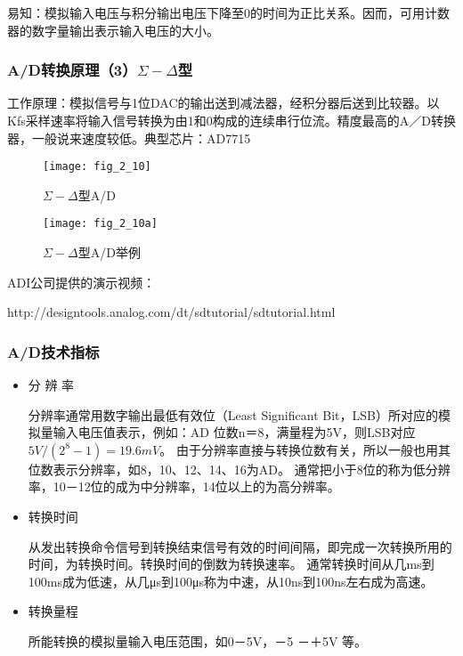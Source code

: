   易知：模拟输入电压与积分输出电压下降至0的时间为正比关系。因而，可用计数器的数字量输出表示输入电压的大小。







\subsubsection{A/D转换原理（3）$\Sigma-\Delta$型}

工作原理：模拟信号与1位DAC的输出送到减法器，经积分器后送到比较器。以Kfs采样速率将输入信号转换为由1和0构成的连续串行位流。精度最高的A／D转换器，一般说来速度较低。典型芯片：AD7715

\begin{figure}[h]
  \centering
  \texttt{[image: fig\_2\_10]}\\
  \caption{$\Sigma-\Delta$型A/D}\label{fig_2_10}
\end{figure}


\begin{figure}[h]
  \centering
  \texttt{[image: fig\_2\_10a]}\\
  \caption{$\Sigma-\Delta$型A/D举例}\label{fig_2_10a}
\end{figure}

\begin{remark}ADI公司提供的演示视频：

  http://designtools.analog.com/dt/sdtutorial/sdtutorial.html
\end{remark}


\subsubsection{A/D技术指标}



\begin{itemize}
  \item 分 辨 率

  分辨率通常用数字输出最低有效位（Least Significant Bit，LSB）所对应的模拟量输入电压值表示，例如：AD 位数n＝8，满量程为5V，则LSB对应$5V/(2^8-1)=19.6mV$。
     由于分辨率直接与转换位数有关，所以一般也用其位数表示分辨率，如8，10、12、14、16为AD。
     通常把小于8位的称为低分辨率，10－12位的成为中分辨率，14位以上的为高分辨率。

  \item 转换时间

  从发出转换命令信号到转换结束信号有效的时间间隔，即完成一次转换所用的时间，为转换时间。转换时间的倒数为转换速率。
      通常转换时间从几ms到100ms成为低速，从几μs到100μs称为中速，从10ns到100ns左右成为高速。

  \item 转换量程

         所能转换的模拟量输入电压范围，如0－5V，－5 －＋5V 等。

\end{itemize}



